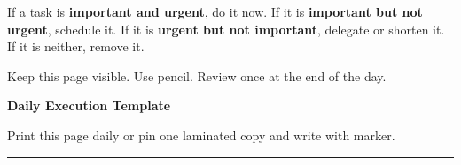 \documentclass[10pt,a4paper]{article}
\newcommand{\pagetitle}[2]{%
  {\fontsize{26}{29}\selectfont\bfseries #1}\par
  {\large\color{SoftInk}#2}\par\vspace{3mm}\hrule\vspace{4mm}
}
\begin{document}
\vspace{2mm}
\begin{tcolorbox}[blankbox,title={Daily decision rule}]
\Large
If a task is \textbf{important and urgent}, do it now. If it is \textbf{important but not urgent}, schedule it. If it is \textbf{urgent but not important}, delegate or shorten it. If it is neither, remove it.
\end{tcolorbox}
\begin{center}\small Keep this page visible. Use pencil. Review once at the end of the day.\end{center}


\newpage


\pagetitle{Daily Execution Template}{Print this page daily or pin one laminated copy and write with marker.}
\end{document}

